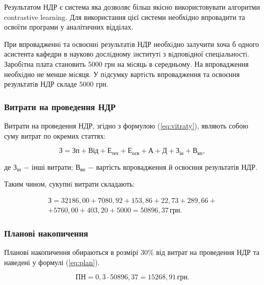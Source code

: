 Результатом НДР є система яка дозволяє більш якісно використовувати алгоритми contrastive learning. Для використання цієї системи необхідно впровадити та освоїти програми у аналітичних відділах.

При впровадженнi та освоєннi результатiв НДР необхiдно залучити хоча б одного асистента кафедри в науково дослiдному iнститутi з вiдповiдної спецiальностi. Заробiтна плата становить 5000 грн на мiсяць в середньому. На впровадження необхiдно не менше мiсяця. У пiдсумку вартiсть впровадження та освоєння результатiв НДР складе $5000$ грн.

\subsubsection{Витрати на проведення НДР}

Витрати на проведення НДР, згідно з формулою (\ref{eq:vitraty}), являють собою суму витрат по окремих статтях:

\begin{equation}\label{eq:vitraty}
\text{З} = \text{Зп} + \text{Від} + \text{Е}_{\text{тех}} + \text{Е}_{\text{осв}} + \text{А} + \text{Д} + \text{З}_{\text{ін}} + \text{В}_{\text{вп}},
\end{equation}

\noindent де $\text{З}_{\text{ін}}$ $-$ інші витрати; \newline
\hspace*{15pt} $ \text{В}_{\text{вп}}$ $-$ вартість впровадження й освоєння результатів НДР.

Таким чином, сукупнi витрати складають:

\begin{eqnarray*}
\text{З} = 32186,00 + 7080,92 + 153,86 + 22,73 + 289,66 + \\ + 5760,00 + 403,20 + 5000  = 50896,37 \, \text{грн}.
\end{eqnarray*}

\vspace{1.5em}

\subsubsection{Планові накопичення}

Планові накопичення обираються в розмірі $30\%$ від витрат на проведення НДР та наведені у формулі (\ref{eq:plan}).

\begin{equation}\label{eq:plan}
\text{ПН} = 0,3 \cdot 50896,37 = 15268,91 \, \text{грн}.
\end{equation}

